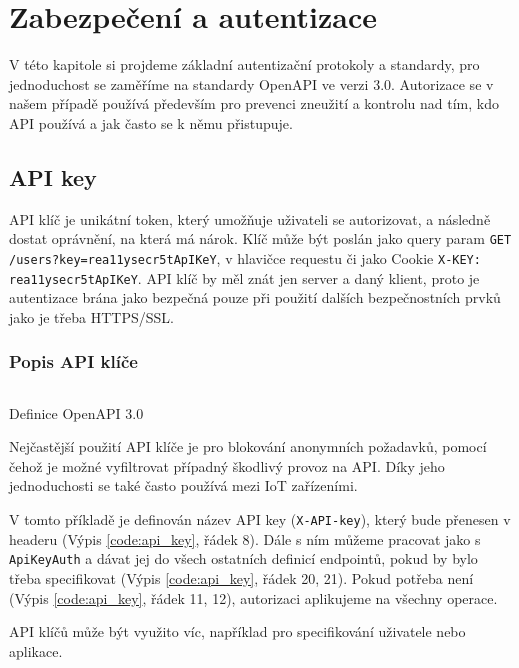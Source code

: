 \chapter{Zabezpečení a autentizace}
V této kapitole si projdeme základní autentizační protokoly a standardy, pro jednoduchost se zaměříme na standardy OpenAPI ve verzi 3.0. Autorizace se v našem případě používá především pro prevenci zneužití a kontrolu nad tím, kdo API používá a jak často se k němu přistupuje.


\section{API key}
API klíč je unikátní token, který umožňuje uživateli se autorizovat, a následně dostat oprávnění, na která má nárok. Klíč může být poslán jako query param \texttt{GET /users?key=rea11ysecr5tApIKeY}, v hlavičce requestu či jako Cookie \texttt{X-KEY: rea11ysecr5tApIKeY}. API klíč by měl znát jen server a daný klient, proto je autentizace brána jako bezpečná pouze při použití dalších bezpečnostních prvků jako je třeba HTTPS/SSL.

\subsection{Popis API klíče}
\begin{listing}[ht]
    \inputminted[]{yaml}{resources/code/security/openapi-key.yml}
    \caption{Definice OpenAPI 3.0}
    \label{code:api_key}
\end{listing}

Nejčastější použití API klíče je pro blokování anonymních požadavků, pomocí čehož je možné vyfiltrovat případný škodlivý provoz na API. Díky jeho jednoduchosti se také často používá mezi IoT zařízeními.

V tomto příkladě je definován název API key (\texttt{X-API-key}), který bude přenesen v headeru (Výpis \ref{code:api_key}, řádek 8). Dále s ním můžeme pracovat jako s \texttt{ApiKeyAuth} a dávat jej do všech ostatních definicí endpointů, pokud by bylo třeba specifikovat (Výpis \ref{code:api_key}, řádek 20, 21). Pokud potřeba není (Výpis \ref{code:api_key}, řádek 11, 12), autorizaci aplikujeme na všechny operace.

API klíčů může být využito víc, například pro specifikování uživatele nebo aplikace.

